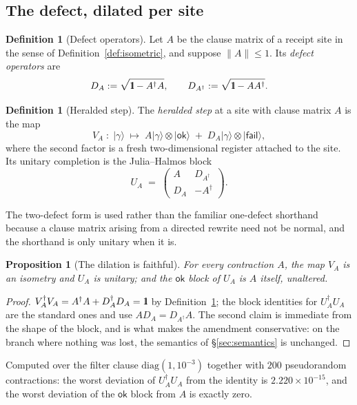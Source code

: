 \documentclass[11pt,a4paper]{article}
\newcommand{\Id}{\mathrm{1}\hspace{-0.30em}\mathrm{l}}
\theoremstyle{plain}
\newtheorem{proposition}[theorem]{Proposition}
\theoremstyle{definition}
\newtheorem{definition}[theorem]{Definition}
\theoremstyle{remark}
\newcommand{\ket}[1]{\lvert #1 \rangle}
\begin{document}
\subsection{The defect, dilated per site}\label{ssec:defect}

\begin{definition}[Defect operators]\label{def:defect}
Let $A$ be the clause matrix of a receipt site in the sense of
Definition~\ref{def:isometric}, and suppose $\|A\| \leq 1$. Its \emph{defect
operators} are
\[
  D_A := \sqrt{\Id - A^{\dagger}A},
  \qquad
  D_{A^{\dagger}} := \sqrt{\Id - AA^{\dagger}} .
\]
\end{definition}

\begin{definition}[Heralded step]\label{def:heraldedstep}
The \emph{heralded step} at a site with clause matrix $A$ is the map
\[
  V_A \;:\; \ket{\gamma} \;\longmapsto\;
    A\ket{\gamma} \otimes \ket{\mathsf{ok}}
    \;+\;
    D_A\ket{\gamma} \otimes \ket{\mathsf{fail}} ,
\]
where the second factor is a fresh two-dimensional register attached to the
site. Its unitary completion is the Julia--Halmos block
\[
  U_A \;=\;
  \begin{pmatrix} A & D_{A^{\dagger}} \\ D_A & -A^{\dagger}\end{pmatrix}.
\]
\end{definition}

The two-defect form is used rather than the familiar one-defect shorthand
because a clause matrix arising from a directed rewrite need not be normal, and
the shorthand is only unitary when it is.

\begin{proposition}[The dilation is faithful]\label{prop:dilation}
For every contraction $A$, the map $V_A$ is an isometry and $U_A$ is unitary;
and the $\mathsf{ok}$ block of $U_A$ is $A$ itself, unaltered.
\end{proposition}

\begin{proof}
$V_A^{\dagger}V_A = A^{\dagger}A + D_A^{\dagger}D_A = \Id$ by
Definition~\ref{def:defect}; the block identities for $U_A^{\dagger}U_A$ are the
standard ones and use $AD_A = D_{A^{\dagger}}A$. The second claim is immediate
from the shape of the block, and is what makes the amendment conservative: on
the branch where nothing was lost, the semantics of \S\ref{sec:semantics} is
unchanged.
\end{proof}

Computed over the filter clause $\mathrm{diag}(1,10^{-3})$ together with $200$
pseudorandom contractions: the worst deviation of $U_A^{\dagger}U_A$ from the
identity is $2.220\times 10^{-15}$, and the worst deviation of the
$\mathsf{ok}$ block from $A$ is exactly zero.
\end{document}
